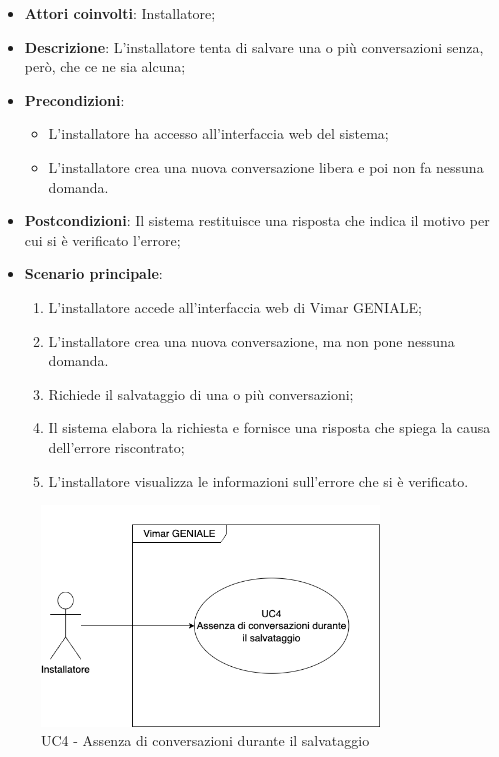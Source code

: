 \begin{itemize}
    \item \textbf{Attori coinvolti}: Installatore;
    \item \textbf{Descrizione}: L’installatore tenta di salvare una o più conversazioni senza, però, che ce ne sia alcuna;
    \item \textbf{Precondizioni}: 
        \begin{itemize}
            \item L’installatore ha accesso all’interfaccia web del sistema;
            \item L'installatore crea una nuova conversazione libera e poi non fa nessuna domanda.
        \end{itemize}
    \item \textbf{Postcondizioni}: Il sistema restituisce una risposta che indica il motivo per cui si è verificato l’errore;
    \item \textbf{Scenario principale}:
    \begin{enumerate}
    \item L’installatore accede all’interfaccia web di Vimar GENIALE;
    \item L'installatore crea una nuova conversazione, ma non pone nessuna domanda.
    \item Richiede il salvataggio di una o più conversazioni;
    \item Il sistema elabora la richiesta e fornisce una risposta che spiega la causa dell'errore riscontrato;
    \item L’installatore visualizza le informazioni sull’errore che si è verificato.
    \end{enumerate}
\end{itemize}
\begin{figure}[H]
\centering
\includegraphics[width=0.8\textwidth]{contents/casi_duso/png/UC4.png}
\caption{UC4 - Assenza di conversazioni durante il salvataggio}
\end{figure}


